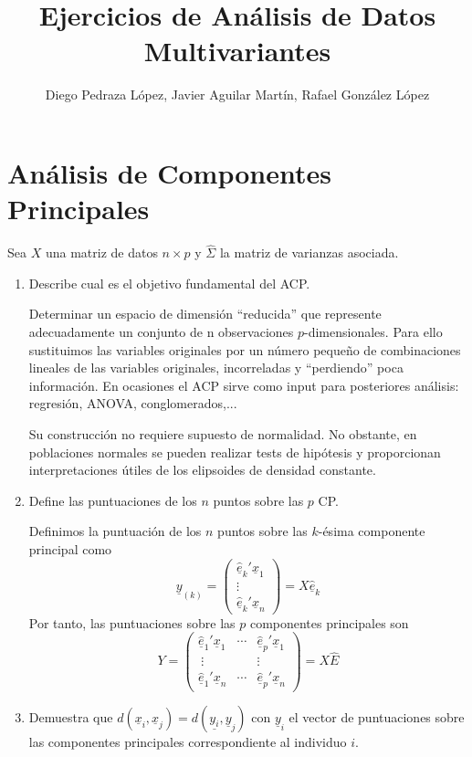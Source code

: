 \documentclass[twoside]{article}
\newcommand{\muestra}[1]{{\underline{#1}}}
\newcommand{\m}[1]{{\muestra{#1}}}
\begin{document}
\title{Ejercicios de Análisis de Datos Multivariantes}
\author{Diego Pedraza López, Javier Aguilar Martín, Rafael González López}
\maketitle

\section{Análisis de Componentes Principales}
Sea $X$ una matriz de datos $n \times p$ y $\widehat{\Sigma}$ la matriz de varianzas asociada.

\begin{enumerate}
\item Describe cual es el objetivo fundamental del ACP.

Determinar un espacio de dimensión \enquote{reducida} que represente adecuadamente un conjunto de n observaciones $p$-dimensionales. Para ello sustituimos las variables originales por un número pequeño de combinaciones lineales de las variables originales, incorreladas y \enquote{perdiendo} poca información. En ocasiones el ACP sirve como input para posteriores análisis: regresión, ANOVA, conglomerados,...

Su construcción no requiere supuesto de normalidad. No obstante, en poblaciones normales se pueden realizar tests de hipótesis y proporcionan interpretaciones útiles de los elipsoides de densidad constante.

\item Define las puntuaciones de los $n$ puntos sobre las $p$ CP. 

Definimos la puntuación de los $n$ puntos sobre las $k$-ésima componente principal como
$$
\muestra{y}_{(k)} = \begin{pmatrix}
{\m{\hat{e}}}_k'\m{x}_1\\
\vdots\\
{\m{\hat{e}}}_k'\m{x}_n
\end{pmatrix} = 
X\m{\hat{e}}_k
$$
Por tanto, las puntuaciones sobre las $p$ componentes principales son
$$
Y = \begin{pmatrix}
{\m{\hat{e}}}_1'\m{x}_1 & \cdots & {\m{\hat{e}}}_p'\m{x}_1\\\
\vdots  &  & \vdots\\
{\m{\hat{e}}}_1'\m{x}_n  & \cdots &	{\m{\hat{e}}}_p'\m{x}_n
\end{pmatrix} 
=X\hat{E}
$$

\item Demuestra que $d(\m{x}_i, \m{x}_j) = d(\muestra{y_i}, \m{y}_j)$ con $\muestra{y}_i$ el vector de puntuaciones sobre las componentes principales correspondiente al individuo $i$. 


\end{enumerate}
\end{document}
